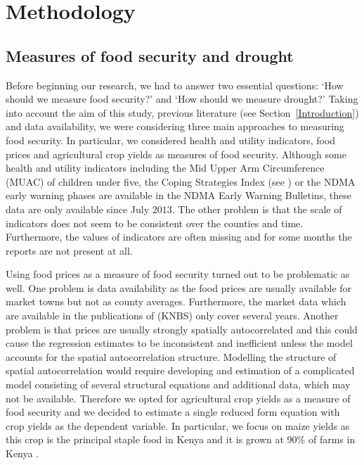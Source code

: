 \documentclass[a4paper,12pt]{article}
\begin{document}
\section{Methodology}\label{Method}

\subsection{Measures of food security and drought}

Before beginning our research, we had to answer two essential %
questions: `How should we measure food security?' and `How should we measure drought?' Taking into account the aim of this study, previous literature (see Section~\ref{Introduction}) and data availability, we were considering three main approaches to measuring food security. In particular, we considered health and utility indicators, food prices and agricultural crop yields as measures of food security. Although some health and utility indicators including the Mid Upper Arm Circumference (MUAC) of children under five, the Coping Strategies Index (see \citealp{CSI}) or the NDMA early warning phases are available in the NDMA Early Warning Bulletins, these data are only available since July $2013$. The other problem is that the scale of indicators does not seem to be consistent over the counties and time. Furthermore, the values of indicators are often missing and for some months the reports are not present at all.

Using food prices as a measure of food security turned out to be problematic as well. 
One problem is data availability as the food prices are usually available for market towns but not as county averages. Furthermore, the market data which are available in the publications of \cite{KNBS} (KNBS) only cover several years. Another problem is that prices are usually strongly spatially autocorrelated and this could cause the regression estimates to be inconsistent and inefficient unless the model accounts for the spatial autocorrelation structure. Modelling the structure of spatial autocorrelation would require developing and estimation of a complicated model consisting of several structural equations and additional data, which may not be available. Therefore we opted for agricultural crop yields as a measure of food security and we decided to estimate a single reduced form equation with crop yields as the dependent variable. In particular, we focus on maize yields as this crop is the principal staple food in Kenya and it is grown at 90\% of farms in Kenya \citep{FAO}.
\end{document}
